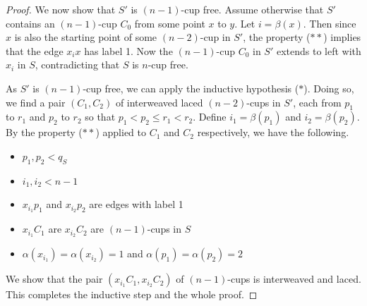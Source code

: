 \documentclass{amsart}
\theoremstyle{definition}
\newtheorem{lemma}[thm]{Lemma}
\numberwithin{thm}{section}
\begin{document}
\begin{proof}

We now show that $S'$ is $(n-1)$-cup free.
Assume otherwise that $S'$ contains an $(n-1)$-cup $C_0$ from some point $x$ to $y$.
Let $i = \beta(x)$. 
Then since $x$ is also the starting point of some $(n-2)$-cup in $S'$, the property ($\ast\ast$) implies that  the edge $x_i x$ has label 1.
Now the $(n-1)$-cup $C_0$ in $S'$ extends to left with $x_i$ in $S$, contradicting that $S$ is $n$-cup free.

As $S'$ is $(n-1)$-cup free, we can apply the inductive hypothesis ($\ast$).
Doing so, we find a pair $(C_1, C_2)$ of interweaved laced $(n-2)$-cups in $S'$, each from $p_1$ to $r_1$ and $p_2$ to $r_2$ so that $p_1 < p_2 \leq r_1 < r_2$.
Define $i_1 = \beta(p_1)$ and $i_2 = \beta(p_2)$. 
By the property ($\ast\ast$) applied to $C_1$ and $C_2$ respectively, we have the following.
\begin{itemize}
	\item $p_1, p_2 < q_S$
	\item $i_1, i_2 < n - 1$
	\item $x_{i_1} p_1$ and $x_{i_2}p_2$ are edges with label 1
	\item $x_{i_1}C_1$ are $x_{i_2}C_2$ are $(n-1)$-cups in $S$
	\item $\alpha(x_{i_1}) = \alpha(x_{i_2}) = 1$ and $\alpha(p_1) = \alpha(p_2) = 2$
\end{itemize}
We show that the pair $(x_{i_1}C_1, x_{i_2}C_2)$ of $(n-1)$-cups is interweaved and laced.
This completes the inductive step and the whole proof.


\end{proof}
\end{document}
